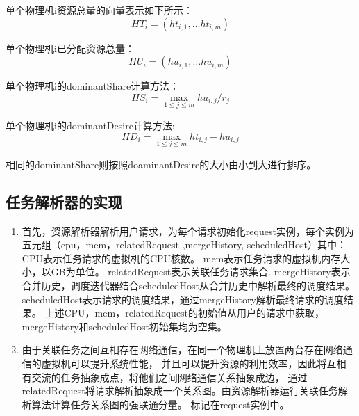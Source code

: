 单个物理机i资源总量的向量表示如下所示：
\begin{equation}
{HT}_{i}=\left({ht}_{i,1},…{ht}_{i,m} \right)
\end{equation}

单个物理机i已分配资源总量：
\begin{equation}
{HU}_{i}=\left({hu}_{i,1},…{hu}_{i,m}\right)
\end{equation}

单个物理机i的dominantShare计算方法：
\begin{equation}
{HS}_{i} = \max \limits_{1 \leq j \leq m} {hu}_{i,j}/{{r}_{j}} 
\end{equation}

单个物理机i的dominantDesire计算方法:
\begin{equation}
{HD}_{i}=\max \limits_{1 \leq j \leq m } {ht}_{i,j}-{hu}_{i,j} 
\end{equation}

相同的dominantShare则按照doaminantDesire的大小由小到大进行排序。
\subsection{任务解析器的实现}
\begin{enumerate}
\item 首先，资源解析器解析用户请求，为每个请求初始化request实例，每个实例为五元组（cpu，mem，relatedRequest ,mergeHistory, scheduledHost）其中：
CPU表示任务请求的虚拟机的CPU核数。
mem表示任务请求的虚拟机内存大小，以GB为单位。
relatedRequest表示关联任务请求集合.
mergeHistory表示合并历史，调度迭代器结合scheduledHost从合并历史中解析最终的调度结果。
scheduledHost表示请求的调度结果，通过mergeHistory解析最终请求的调度结果。
上述CPU，mem，relatedRequest的初始值从用户的请求中获取，mergeHistory和scheduledHost初始集均为空集。

\item 由于关联任务之间互相存在网络通信，在同一个物理机上放置两台存在网络通信的虚拟机可以提升系统性能，
并且可以提升资源的利用效率，因此将互相有交流的任务抽象成点，将他们之间网络通信关系抽象成边，
通过relatedRequest将请求解析抽象成一个关系图。由资源解析器运行关联任务解析算法计算任务关系图的强联通分量。
标记在request实例中。
\end{enumerate}


